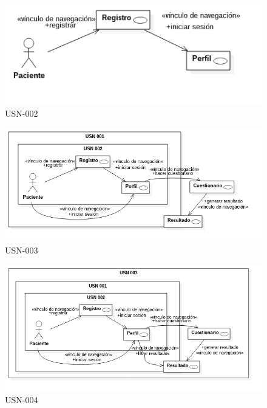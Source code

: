 \begin{figure}[htbp] 
    \centering
    \includegraphics[width=1\textwidth]{figuras/usn/usn002_pac.png}
    \caption{USN-002}
    \label{fig:usn-002}
\end{figure}	

\begin{figure}[htbp] 
    \centering
    \includegraphics[width=1\textwidth]{figuras/usn/usn003.png}
    \caption{USN-003}
    \label{fig:usn-003}
\end{figure}	

\begin{figure}[htbp] 
    \centering
    \includegraphics[width=1\textwidth]{figuras/usn/usn004.png}
    \caption{USN-004}
    \label{fig:usn-004}
\end{figure}	

